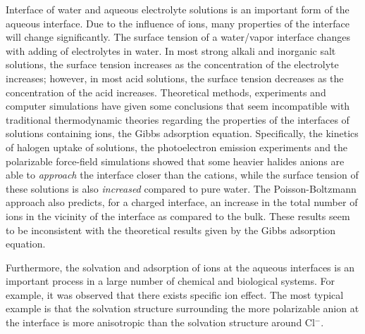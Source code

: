 Interface of water and aqueous electrolyte solutions is an important form of the aqueous interface.
Due to the influence of ions, many properties of the interface will change significantly.
The surface tension of a water/vapor interface changes with adding of electrolytes in water\cite{Pegram2006}.
In most strong alkali and inorganic salt solutions, the surface tension increases as the concentration of the electrolyte increases; 
however, in most acid solutions, the surface tension decreases as the concentration of the acid increases.
%
Theoretical methods, experiments and computer simulations have given some conclusions that seem incompatible with traditional thermodynamic theories regarding the properties of the interfaces of solutions containing ions, the Gibbs adsorption equation.
Specifically, the kinetics of halogen uptake of solutions\cite{HuJH95}, the photoelectron emission experiments\cite{Markovich1991,Ghosal05,Garrett04} and the polarizable 
force-field simulations\cite{Perera1991,Dang1993,Knipping00,Jungwirth2001,Jungwirth2002,PJ06,Horinek07,Brown08,CST11} showed that 
some heavier halides anions are able to \emph{approach} the interface closer than the cations, 
while the surface tension of these solutions is also \emph{increased} compared to pure water. 
The Poisson-Boltzmann approach also predicts, for a charged interface, an increase in the total number of ions in the vicinity of the interface as compared to the bulk\cite{Manciu2003}.
These results seem to be inconsistent with the theoretical results given by the Gibbs adsorption equation\cite{Gibbs1928, Adam1941}.

Furthermore, the solvation and adsorption of ions at the aqueous interfaces is an important process in a large number of chemical and biological systems\cite{Chang06}.
For example, it was observed that there exists specific ion effect. 
The most typical example is that the solvation structure surrounding the more polarizable \I anion at the interface is more anisotropic than the solvation structure around Cl$^-$.

